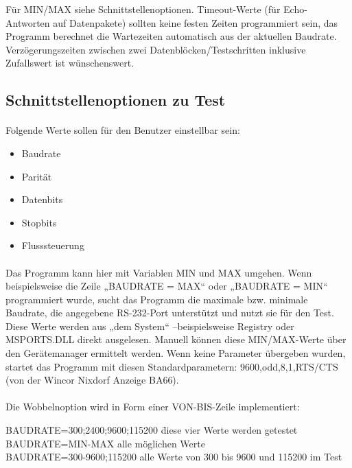 Für MIN/MAX siehe Schnittstellenoptionen. Timeout-Werte (für Echo-Antworten auf Datenpakete) sollten keine festen Zeiten programmiert sein, das Programm  berechnet die Wartezeiten automatisch aus der aktuellen Baudrate. Verzögerungszeiten zwischen zwei Datenblöcken/Testschritten inklusive Zufallswert ist wünschenswert.


\subsection{Schnittstellenoptionen zu Test}
\paragraph{}
Folgende Werte sollen für den Benutzer einstellbar sein:

\begin{itemize}
\item Baudrate
\item Parität
\item Datenbits
\item Stopbits
\item Flusssteuerung
\end{itemize}
\paragraph{}
Das Programm kann hier mit Variablen MIN und MAX umgehen. Wenn beispielsweise die Zeile „BAUDRATE = MAX“ oder „BAUDRATE = MIN“  programmiert wurde,  sucht das Programm die maximale bzw. minimale Baudrate, die angegebene RS-232-Port unterstützt und nutzt sie für den Test. Diese Werte werden aus „dem System“ –beispielsweise Registry oder  MSPORTS.DLL direkt ausgelesen. Manuell können diese MIN/MAX-Werte über den Gerätemanager ermittelt werden. Wenn keine Parameter übergeben wurden, startet das Programm mit diesen Standardparametern: 9600,odd,8,1,RTS/CTS (von der Wincor Nixdorf Anzeige BA66).

\paragraph{}
Die Wobbelnoption wird in Form einer VON-BIS-Zeile implementiert:

\begin{tabbing}
\hspace*{10mm} BAUDRATE=300;2400;9600;115200 \= diese vier Werte werden getestet
\\
\hspace*{10mm} BAUDRATE=MIN-MAX \>alle möglichen Werte
\\
\hspace*{10mm} BAUDRATE=300-9600;115200 \>alle Werte von 300 bis 9600 und 115200 im Test
\end{tabbing}


